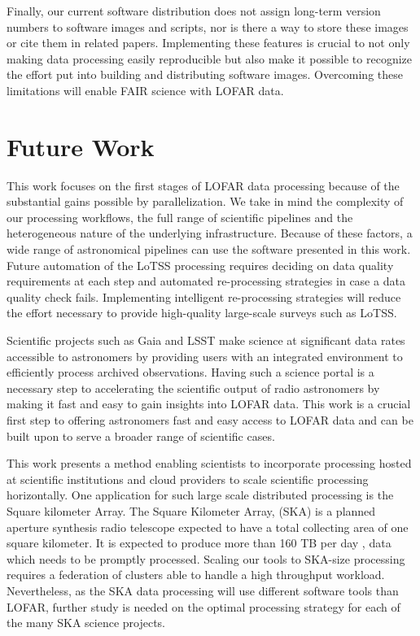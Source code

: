 Finally, our current software distribution does not assign long-term version numbers to software images and scripts, nor is there a way to store these images or cite them in related papers. Implementing these features is crucial to not only making data processing easily reproducible but also make it possible to recognize the effort put into building and distributing software images. Overcoming these limitations will enable FAIR science with LOFAR data\citep{wilkinson2016fair}.


\section{Future Work}

This work focuses on the first stages of LOFAR data processing because of the substantial gains possible by parallelization. We take in mind the complexity of our processing workflows, the full range of scientific pipelines and the heterogeneous nature of the underlying infrastructure. Because of these factors, a wide range of astronomical pipelines can use the software presented in this work. Future automation of the LoTSS processing requires deciding on data quality requirements at each step and automated re-processing strategies in case a data quality check fails. Implementing intelligent re-processing strategies will reduce the effort necessary to provide high-quality large-scale surveys such as LoTSS. 

Scientific projects such as Gaia and LSST make science at significant data rates accessible to astronomers by providing users with an integrated environment to efficiently process archived observations. Having such a science portal is a necessary step to accelerating the scientific output of radio astronomers by making it fast and easy to gain insights into LOFAR data. This work is a crucial first step to offering astronomers fast and easy access to LOFAR data and can be built upon to serve a broader range of scientific cases.

This work presents a method enabling scientists to incorporate processing hosted at scientific institutions and cloud providers to scale scientific processing horizontally. One application for such large scale distributed processing is the Square kilometer Array. The Square Kilometer Array, (SKA) is a planned aperture synthesis radio telescope expected to have a total collecting area of one square kilometer. It is expected to produce more than 160 TB per day \citep{johnston2017taming}, data which needs to be promptly processed. Scaling our tools to SKA-size processing requires a federation of clusters able to handle a high throughput workload. Nevertheless, as the SKA data processing will use different software tools than LOFAR, further study is needed on the optimal processing strategy for each of the many SKA science projects.


